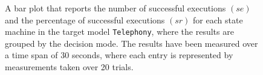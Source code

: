 \begin{figure}[h!]
\centering
\begin{minipage}{1\textwidth}
  \centering
  \makebox[\textwidth][c]{ %
        \resizebox{1.19\textwidth}{!}{ %
            
        }%
    }%
\end{minipage}
\caption{A bar plot that reports the number of successful executions $(se)$ and the percentage of successful executions $(sr)$ for each state machine in the target model \texttt{Telephony}, where the results are grouped by the decision mode. The results have been measured over a time span of 30 seconds, where each entry is represented by measurements taken over 20 trials.}
\label{figure:decision_mode_state_machine_transition_frequency_comparison_telephony}
\end{figure}